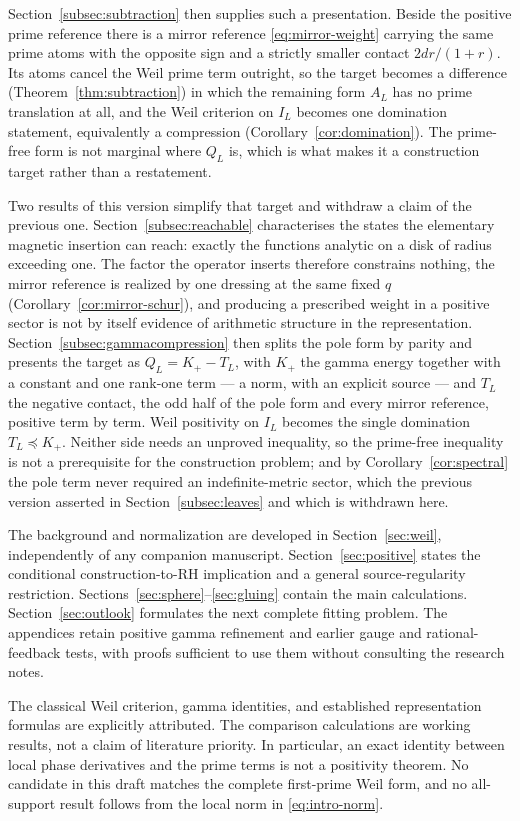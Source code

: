 Section~\ref{subsec:subtraction} then supplies such a presentation. Beside
the positive prime reference there is a mirror reference
\eqref{eq:mirror-weight} carrying the same prime atoms with the opposite sign
and a strictly smaller contact $2dr/(1+r)$. Its atoms cancel the Weil prime
term outright, so the target becomes a difference
(Theorem~\ref{thm:subtraction}) in which the remaining form $A_L$ has no
prime translation at all, and the Weil criterion on $I_L$ becomes one
domination statement, equivalently a compression
(Corollary~\ref{cor:domination}). The prime-free form is not marginal where
$Q_L$ is, which is what makes it a construction target rather than a
restatement.

Two results of this version simplify that target and withdraw a claim of the
previous one. Section~\ref{subsec:reachable} characterises the states the
elementary magnetic insertion can reach: exactly the functions analytic on a
disk of radius exceeding one. The factor the operator inserts therefore
constrains nothing, the mirror reference is realized by one dressing at the
same fixed $q$ (Corollary~\ref{cor:mirror-schur}), and producing a prescribed
weight in a positive sector is not by itself evidence of arithmetic structure
in the representation. Section~\ref{subsec:gammacompression} then splits the
pole form by parity and presents the target as $Q_L=K_+-T_L$, with $K_+$ the
gamma energy together with a constant and one rank-one term --- a norm, with an
explicit source --- and $T_L$ the negative contact, the odd half of the pole
form and every mirror reference, positive term by term. Weil positivity on
$I_L$ becomes the single domination $T_L\preceq K_+$. Neither side needs an
unproved inequality, so the prime-free inequality is not a prerequisite for the
construction problem; and by Corollary~\ref{cor:spectral} the pole term never
required an indefinite-metric sector, which the previous version asserted in
Section~\ref{subsec:leaves} and which is withdrawn here.

The background and normalization are developed in
Section~\ref{sec:weil}, independently of any companion manuscript.
Section~\ref{sec:positive} states the conditional construction-to-RH
implication and a general source-regularity restriction.
Sections~\ref{sec:sphere}--\ref{sec:gluing} contain the main calculations.
Section~\ref{sec:outlook} formulates the next complete fitting problem.
The appendices retain positive gamma refinement and earlier gauge and
rational-feedback tests, with proofs sufficient to use them without
consulting the research notes.

The classical Weil criterion, gamma identities, and established
representation formulas are explicitly attributed. The comparison
calculations are working results, not a claim of literature priority.
In particular, an exact identity between local phase derivatives and
the prime terms is not a positivity theorem. No candidate in this draft
matches the complete first-prime Weil form, and no all-support result
follows from the local norm in \eqref{eq:intro-norm}.
